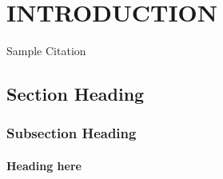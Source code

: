 \chapter{INTRODUCTION}


\hspace{2em} \blindtext %
 Sample Citation \cite{9}
\section{Section Heading}

\hspace{2em} \blindtext  %


\subsection{Subsection Heading}
\hspace{2em} \blindtext %

\subsubsection{Heading here}
\hspace{2em} \blindtext %

